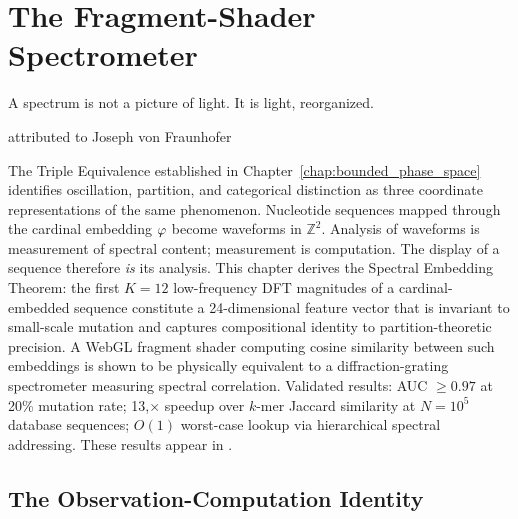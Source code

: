 
\chapter{The Fragment-Shader Spectrometer}
\label{chap:shader_spectrometer}

\epigraph{%
  A spectrum is not a picture of light. It is light, reorganized.%
}{attributed to Joseph von Fraunhofer}

\begin{chapterbox}
The Triple Equivalence established in Chapter~\ref{chap:bounded_phase_space}
identifies oscillation, partition, and categorical distinction as three
coordinate representations of the same phenomenon. Nucleotide sequences mapped
through the cardinal embedding $\varphi$ become waveforms in $\mathbb{Z}^2$.
Analysis of waveforms is measurement of spectral content; measurement is
computation. The display of a sequence therefore \emph{is} its analysis. This
chapter derives the Spectral Embedding Theorem: the first $K=12$ low-frequency
DFT magnitudes of a cardinal-embedded sequence constitute a 24-dimensional
feature vector that is invariant to small-scale mutation and captures
compositional identity to partition-theoretic precision. A WebGL fragment
shader computing cosine similarity between such embeddings is shown to be
physically equivalent to a diffraction-grating spectrometer measuring
spectral correlation. Validated results: AUC $\geq 0.97$ at 20\% mutation
rate; 13,$\times$ speedup over $k$-mer Jaccard similarity at
$N=10^5$ database sequences; $O(1)$ worst-case lookup via hierarchical
spectral addressing. These results appear in \citet{Sachikonye2025_Shader}.
\end{chapterbox}

\section{The Observation-Computation Identity}
\label{sec:observation_computation}

